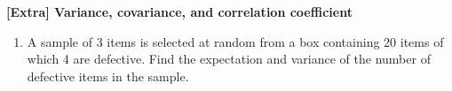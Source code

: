\documentclass[12pt]{article}%
\newcommand{\0}{{\bf 0}}
\begin{document}
\begin{center}
{\Large\bf [Extra] Variance, covariance, and correlation coefficient} 
\end{center}






\begin{enumerate}


\item
A sample of 3 items is selected at random from a box containing 20 items of which 4 are defective. 
Find the expectation and variance of the number of defective items in the sample.


\end{enumerate}
\end{document}
